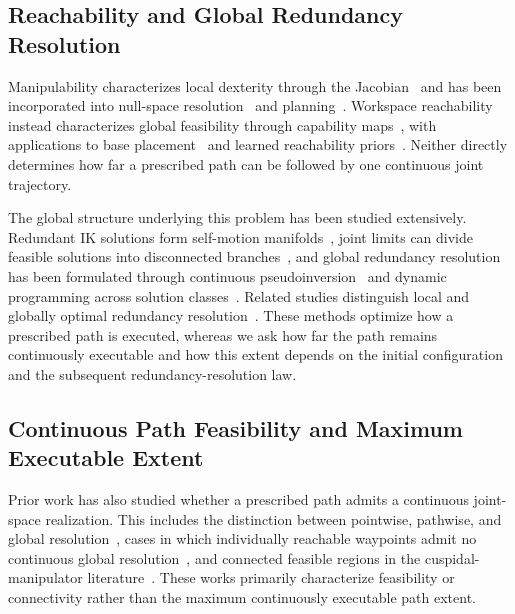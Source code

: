 \documentclass[journal, twoside]{IEEEtran}
\begin{document}
\subsection{Reachability and Global Redundancy Resolution}

Manipulability characterizes local dexterity through the
Jacobian~\cite{yoshikawa1985manipulability,yoshikawa1985dynamic,chiu1988task,klein1987dexterity}
and has been incorporated into null-space
resolution~\cite{liegeois1977automatic,jin2017manipulability,jaquier2021geometry,haviland2021neo}
and planning~\cite{shen2023adaptive,cai2025just}. Workspace reachability
instead characterizes global feasibility through capability
maps~\cite{yang2009placement,zacharias2007capturing}, with applications to
base placement~\cite{makhal2018reuleaux,vahrenkamp2013robot} and learned
reachability priors~\cite{feng2025predictive,jauhri2022robot,selim2022safe}.
Neither directly determines how far a prescribed path can be followed by
one continuous joint trajectory.

The global structure underlying this problem has been studied extensively.
Redundant IK solutions form self-motion
manifolds~\cite{burdick1989inverse}, joint limits can divide feasible
solutions into disconnected branches~\cite{shimizu2008analytical,luck1993self},
and global redundancy resolution has been formulated through continuous
pseudoinversion~\cite{hauser2018global} and dynamic programming across
solution classes~\cite{ferrentino2020optimal,ferrentino2021globally,fabregat2025topological}.
Related studies distinguish local and globally optimal redundancy
resolution~\cite{martin1989resolution,suh1987local,kazerounian1988global}.
These methods optimize how a prescribed path is executed, whereas we ask
how far the path remains continuously executable and how this extent
depends on the initial configuration and the subsequent redundancy-resolution
law.

\subsection{Continuous Path Feasibility and Maximum Executable Extent}

Prior work has also studied whether a prescribed path admits a continuous
joint-space realization. This includes the distinction between pointwise,
pathwise, and global resolution~\cite{hauser2016continuous}, cases in
which individually reachable waypoints admit no continuous global
resolution~\cite{hauser2018global}, and connected feasible regions in the
cuspidal-manipulator literature~\cite{wenger1991uniqueness,wenger2023cuspidal,elias2025cuspidal}.
These works primarily characterize feasibility or connectivity rather than
the maximum continuously executable path extent.
\end{document}
